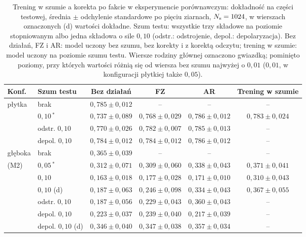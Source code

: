 \begin{table}[tb]
\centering
\caption[Trening w szumie a korekta po fakcie: dokładność na pięciu ziarnach]{Trening w szumie a korekta po fakcie w eksperymencie porównawczym: dokładność na części testowej, średnia $\pm$ odchylenie standardowe po pięciu ziarnach, $N_{\mathrm{s}}=1024$, w wierszach oznaczonych (d) wartości dokładne. Szum testu: wszystkie trzy składowe na poziomie stopniowanym albo jedna składowa o sile $0{,}10$ (odstr.: odstrojenie, depol.: depolaryzacja). Bez działań, FZ i AR: model uczony bez szumu, bez korekty i z korektą odczytu; trening w szumie: model uczony na poziomie szumu testu. Wiersze rodziny głównej oznaczono gwiazdką; pominięto poziomy, przy których wartości różnią się od wiersza bez szumu najwyżej o $0{,}01$ ($0{,}01$, w konfiguracji płytkiej także $0{,}05$).}
\label{tab:cls:training}
\footnotesize
\setlength{\tabcolsep}{3pt}
\begin{tabular}{@{}llcccc@{}}
\toprule
Konf. & Szum testu & Bez działań & FZ & AR & Trening w szumie \\
\midrule
płytka & brak & $0{,}785\pm0{,}012$ & -- & -- & -- \\
 & $0{,}10$\,$^{\ast}$ & $0{,}737\pm0{,}089$ & $0{,}768\pm0{,}029$ & $0{,}786\pm0{,}012$ & $0{,}783\pm0{,}024$ \\
 & odstr. $0{,}10$ & $0{,}770\pm0{,}026$ & $0{,}782\pm0{,}007$ & $0{,}785\pm0{,}013$ & -- \\
 & depol. $0{,}10$ & $0{,}784\pm0{,}012$ & $0{,}784\pm0{,}012$ & $0{,}786\pm0{,}012$ & -- \\
\addlinespace
głęboka & brak & $0{,}365\pm0{,}039$ & -- & -- & -- \\
(M2) & $0{,}05$\,$^{\ast}$ & $0{,}312\pm0{,}071$ & $0{,}309\pm0{,}060$ & $0{,}338\pm0{,}043$ & $0{,}371\pm0{,}041$ \\
 & $0{,}10$ & $0{,}163\pm0{,}018$ & $0{,}177\pm0{,}028$ & $0{,}171\pm0{,}010$ & $0{,}310\pm0{,}043$ \\
 & $0{,}10$ (d) & $0{,}187\pm0{,}063$ & $0{,}246\pm0{,}098$ & $0{,}334\pm0{,}043$ & $0{,}367\pm0{,}055$ \\
 & odstr. $0{,}10$ & $0{,}187\pm0{,}056$ & $0{,}229\pm0{,}043$ & $0{,}360\pm0{,}043$ & -- \\
 & depol. $0{,}10$ & $0{,}223\pm0{,}037$ & $0{,}239\pm0{,}040$ & $0{,}217\pm0{,}039$ & -- \\
 & depol. $0{,}10$ (d) & $0{,}346\pm0{,}040$ & $0{,}347\pm0{,}038$ & $0{,}357\pm0{,}034$ & -- \\
\bottomrule
\end{tabular}
\end{table}
